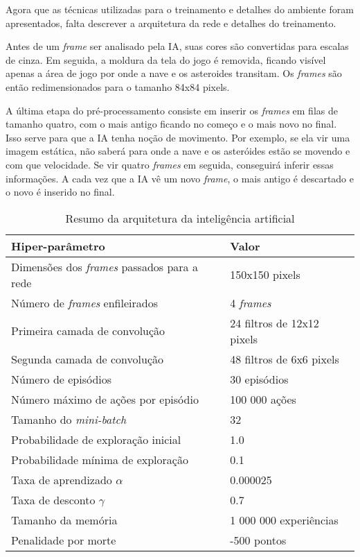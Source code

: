 Agora que as técnicas utilizadas para o treinamento e detalhes do ambiente foram apresentados, falta descrever a arquitetura da rede e detalhes do treinamento.

Antes de um \textit{frame} ser analisado pela IA, suas cores são convertidas para escalas de cinza.
Em seguida, a moldura da tela do jogo é removida, ficando visível apenas a área de jogo por onde a nave e os asteroides transitam.
Os \textit{frames} são então redimensionados para o tamanho 84x84 pixels.

A última etapa do pré-processamento consiste em inserir os \textit{frames} em filas de tamanho quatro, com o mais antigo ficando no começo e o mais novo no final. Isso serve para que a IA tenha noção de movimento.
Por exemplo, se ela vir uma imagem estática, não saberá para onde a nave e os asteróides estão se movendo e com que velocidade.
Se vir quatro \textit{frames} em seguida, conseguirá inferir essas informações.
A cada vez que a IA vê um novo \textit{frame}, o mais antigo é descartado e o novo é inserido no final.

\begin{table}
\centering
\begin{tabular}{| p{7cm} | p{7cm} |}
  \hline
  \textbf{Hiper-parâmetro} & \textbf{Valor} \\ \hline
  Dimensões dos \textit{frames} passados para a rede & 150x150 pixels \\ \hline
  Número de \textit{frames} enfileirados & 4 \textit{frames} \\ \hline
  Primeira camada de convolução & 24 filtros de 12x12 pixels \\ \hline
  Segunda camada de convolução & 48 filtros de 6x6 pixels \\ \hline
  Número de episódios & 30 episódios \\ \hline
  Número máximo de ações por episódio & 100 000 ações \\ \hline
  Tamanho do \textit{mini-batch} & 32 \\ \hline
  Probabilidade de exploração inicial & 1.0 \\ \hline
  Probabilidade mínima de exploração & 0.1 \\ \hline
  Taxa de aprendizado $\alpha$ & 0.000025 \\ \hline
  Taxa de desconto $\gamma$ & 0.7 \\ \hline
  Tamanho da memória & 1 000 000 experiências \\ \hline
  Penalidade por morte & -500 pontos \\ \hline
\end{tabular}
\caption{Resumo da arquitetura da inteligência artificial}
\label{table:2}
\end{table}

